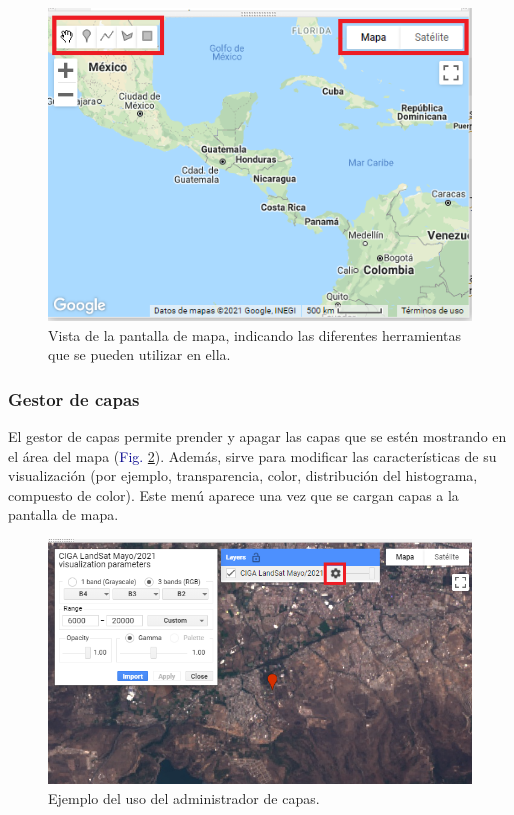 \documentclass[
  12pt,
  letterpaper,
  twoside]{book}
\begin{document}
\begin{figure}[H]

{\centering \includegraphics[width=0.95\linewidth]{Img/drawing} 

}

\caption{Vista de la pantalla de mapa, indicando las diferentes herramientas que se pueden utilizar en ella.}\label{fig:f217}
\end{figure}

\hypertarget{gestor-de-capas}{%
\subsubsection*{Gestor de capas}\label{gestor-de-capas}}

El gestor de capas permite prender y apagar las capas que se estén mostrando en el área del mapa (\textcolor{darkblue}{Fig.} \ref{fig:f218}). Además, sirve para modificar las características de su visualización (por ejemplo, transparencia, color, distribución del histograma, compuesto de color). Este menú aparece una vez que se cargan capas a la pantalla de mapa.

\begin{figure}[H]

{\centering \includegraphics[width=0.95\linewidth]{Img/layer} 

}

\caption{Ejemplo del uso del administrador de capas.}\label{fig:f218}
\end{figure}
\end{document}
